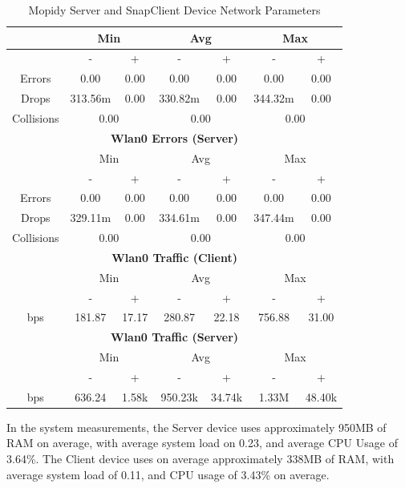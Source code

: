 \documentclass[11pt,a4paper]{scrreprt}
\begin{document}
\begin{table}[H]
\begin{tabular}{||c|c|c|c|c|c|c||}
    \hline\hline
      & \multicolumn{2}{|c|}{Min} & \multicolumn{2}{|c|}{Avg} & \multicolumn{2}{|c|}{Max} \\
    \hline
      & - & + & - & + & - & + \\
    \hline
    Errors  & 0.00 & 0.00 & 0.00 & 0.00 & 0.00 & 0.00 \\
    \hline
    Drops & 313.56m & 0.00 & 330.82m & 0.00 & 344.32m & 0.00 \\
    \hline
    Collisions & \multicolumn{2}{|c|}{0.00} & \multicolumn{2}{|c|}{0.00} & \multicolumn{2}{|c|}{0.00} \\
    \hline\hline
    \multicolumn{7}{|c|}{\textbf{Wlan0 Errors (Server)}} \\
    \hline\hline
      & \multicolumn{2}{|c|}{Min} & \multicolumn{2}{|c|}{Avg} & \multicolumn{2}{|c|}{Max} \\
    \hline
      & - & + & - & + & - & + \\
    \hline
    Errors  & 0.00 & 0.00 & 0.00 & 0.00 & 0.00 & 0.00 \\
    \hline
    Drops & 329.11m & 0.00 & 334.61m & 0.00 & 347.44m & 0.00 \\
    \hline
    Collisions & \multicolumn{2}{|c|}{0.00} & \multicolumn{2}{|c|}{0.00} & \multicolumn{2}{|c|}{0.00} \\
    \hline\hline
    \multicolumn{7}{|c|}{\textbf{Wlan0 Traffic (Client)}} \\
    \hline\hline
      & \multicolumn{2}{|c|}{Min} & \multicolumn{2}{|c|}{Avg} & \multicolumn{2}{|c|}{Max} \\
    \hline
      & - & + & - & + & - & + \\
    \hline
    bps  & 181.87 & 17.17 & 280.87 & 22.18 & 756.88 & 31.00 \\
    \hline\hline
    \multicolumn{7}{|c|}{\textbf{Wlan0 Traffic (Server)}} \\
    \hline\hline
      & \multicolumn{2}{|c|}{Min} & \multicolumn{2}{|c|}{Avg} & \multicolumn{2}{|c|}{Max} \\
    \hline
      & - & + & - & + & - & + \\
    \hline
    bps  & 636.24 & 1.58k & 950.23k & 34.74k & 1.33M & 48.40k \\
    \hline\hline
    \end{tabular}
    \caption{Mopidy Server and SnapClient Device Network Parameters}
    \label{MopidyclientserverNetTab}
\end{table}

In the system measurements, the Server device uses approximately 950MB
of RAM on average, with average system load on 0.23, and average CPU
Usage of 3.64\%. The Client device uses on average approximately 338MB
of RAM, with average system load of 0.11, and CPU usage of 3.43\% on
average.
\end{document}
